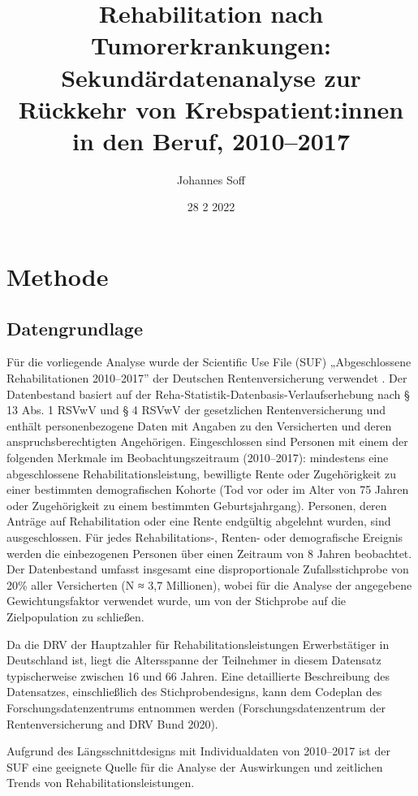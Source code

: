 \documentclass[
]{article}
\title{Rehabilitation nach Tumorerkrankungen: Sekundärdatenanalyse zur
Rückkehr von Krebspatient:innen in den Beruf, 2010--2017}
\author{Johannes Soff}
\date{28 2 2022}
\begin{document}
\maketitle

\hypertarget{methode}{%
\section{Methode}\label{methode}}

\hypertarget{datengrundlage}{%
\subsection{Datengrundlage}\label{datengrundlage}}

Für die vorliegende Analyse wurde der Scientific Use File (SUF)
„Abgeschlossene Rehabilitationen 2010--2017'' der Deutschen
Rentenversicherung verwendet . Der Datenbestand basiert auf der
Reha-Statistik-Datenbasis-Verlaufserhebung nach § 13 Abs. 1 RSVwV und §
4 RSVwV der gesetzlichen Rentenversicherung und enthält personenbezogene
Daten mit Angaben zu den Versicherten und deren anspruchsberechtigten
Angehörigen. Eingeschlossen sind Personen mit einem der folgenden
Merkmale im Beobachtungszeitraum (2010--2017): mindestens eine
abgeschlossene Rehabilitationsleistung, bewilligte Rente oder
Zugehörigkeit zu einer bestimmten demografischen Kohorte (Tod vor oder
im Alter von 75 Jahren oder Zugehörigkeit zu einem bestimmten
Geburtsjahrgang). Personen, deren Anträge auf Rehabilitation oder eine
Rente endgültig abgelehnt wurden, sind ausgeschlossen. Für jedes
Rehabilitations-, Renten- oder demografische Ereignis werden die
einbezogenen Personen über einen Zeitraum von 8 Jahren beobachtet. Der
Datenbestand umfasst insgesamt eine disproportionale Zufallsstichprobe
von 20\% aller Versicherten (N ≈ 3,7 Millionen), wobei für die Analyse
der angegebene Gewichtungsfaktor verwendet wurde, um von der Stichprobe
auf die Zielpopulation zu schließen.

Da die DRV der Hauptzahler für Rehabilitationsleistungen Erwerbstätiger
in Deutschland ist, liegt die Altersspanne der Teilnehmer in diesem
Datensatz typischerweise zwischen 16 und 66 Jahren. Eine detaillierte
Beschreibung des Datensatzes, einschließlich des Stichprobendesigns,
kann dem Codeplan des Forschungsdatenzentrums entnommen werden
(Forschungsdatenzentrum der Rentenversicherung and DRV Bund 2020).

Aufgrund des Längsschnittdesigns mit Individualdaten von 2010--2017 ist
der SUF eine geeignete Quelle für die Analyse der Auswirkungen und
zeitlichen Trends von Rehabilitationsleistungen.
\end{document}
